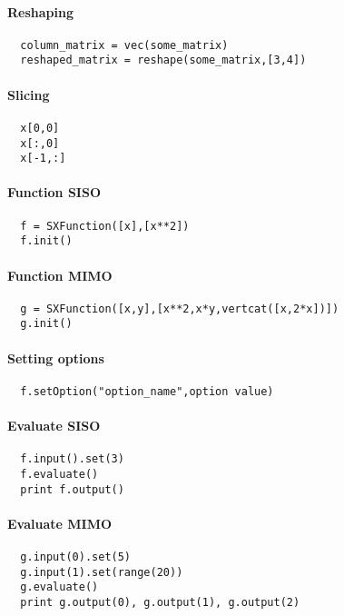 \documentclass[a4paper,8pt,twocolumn]{article}
\begin{document}
\paragraph{Reshaping}
\begin{verbatim}
  column_matrix = vec(some_matrix)
  reshaped_matrix = reshape(some_matrix,[3,4])
\end{verbatim}

\paragraph{Slicing}
\begin{verbatim}
  x[0,0]
  x[:,0]
  x[-1,:]
\end{verbatim}

\paragraph{Function SISO}

\begin{verbatim}
  f = SXFunction([x],[x**2])
  f.init()
\end{verbatim}

\paragraph{Function MIMO}
\begin{verbatim}
  g = SXFunction([x,y],[x**2,x*y,vertcat([x,2*x])])
  g.init()
\end{verbatim}

\paragraph{Setting options}
\begin{verbatim}
  f.setOption("option_name",option value)
\end{verbatim}

\paragraph{Evaluate SISO}

\begin{verbatim}
  f.input().set(3)
  f.evaluate()
  print f.output()
\end{verbatim}

\paragraph{Evaluate MIMO}
\begin{verbatim}
  g.input(0).set(5)
  g.input(1).set(range(20))
  g.evaluate()
  print g.output(0), g.output(1), g.output(2)
\end{verbatim}
\end{document}
